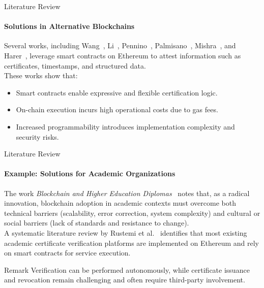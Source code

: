 \begin{frame}{Literature Review}
    \framesubtitle{Solutions in Alternative Blockchains}
Several works, including Wang~\cite{Wang2019BlockchainCT}, Li~\cite{Li2020DecentralizedPKI}, Pennino~\cite{Pennino2021EfficientCertification}, Palmisano~\cite{Palmisano2022NotarizationAntiPlagiarism}, Mishra~\cite{Mishra2025BlockchainDecentralized}, and Harer~\cite{Harer2022DecentralizedAttestation}, leverage smart contracts on Ethereum to attest information such as certificates, timestamps, and structured data.\\
\vspace*{0.2cm}
These works show that:
\begin{itemize}
    \item Smart contracts enable expressive and flexible certification logic.
    \item On-chain execution incurs high operational costs due to gas fees.
    \item Increased programmability introduces implementation complexity and security risks.
\end{itemize}
\end{frame}

\begin{frame}{Literature Review}
    \framesubtitle{Example: Solutions for Academic Organizations}
The work \emph{Blockchain and Higher Education Diplomas}~\cite{Castro2021BlockchainHigherEducation} notes that, as a radical innovation, blockchain adoption in academic contexts must overcome both technical barriers (scalability, error correction, system complexity) and cultural or social barriers (lack of standards and resistance to change).\\
\vspace*{0.2cm}
A systematic literature review by Rustemi et al.~\cite{Rustemi2023SLRBlockchainCertificates} identifies that most existing academic certificate verification platforms are implemented on Ethereum and rely on smart contracts for service execution.
\begin{block}{Remark}
Verification can be performed autonomously, while certificate issuance and revocation remain challenging and often require third-party involvement.
\end{block}
\end{frame}


